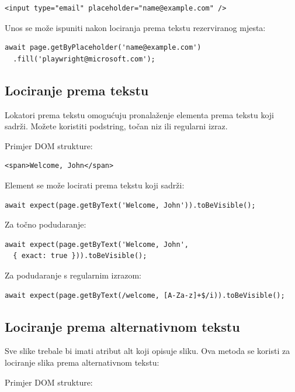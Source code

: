 \begin{verbatim}
<input type="email" placeholder="name@example.com" />
\end{verbatim}

Unos se može ispuniti nakon lociranja prema tekstu rezerviranog mjesta:

\begin{verbatim}
await page.getByPlaceholder('name@example.com')
  .fill('playwright@microsoft.com');
\end{verbatim}

\subsection*{Lociranje prema tekstu}

Lokatori prema tekstu omogućuju pronalaženje elementa prema tekstu koji sadrži.
Možete koristiti podstring, točan niz ili regularni izraz.

Primjer DOM strukture:

\begin{verbatim}
<span>Welcome, John</span>
\end{verbatim}

Element se može locirati prema tekstu koji sadrži:

\begin{verbatim}
await expect(page.getByText('Welcome, John')).toBeVisible();
\end{verbatim}

Za točno podudaranje:

\begin{verbatim}
await expect(page.getByText('Welcome, John', 
  { exact: true })).toBeVisible();
\end{verbatim}

Za podudaranje s regularnim izrazom:

\begin{verbatim}
await expect(page.getByText(/welcome, [A-Za-z]+$/i)).toBeVisible();
\end{verbatim}

\subsection*{Lociranje prema alternativnom tekstu}

Sve slike trebale bi imati atribut alt koji opisuje sliku.
Ova metoda se koristi za lociranje slika prema alternativnom tekstu:

Primjer DOM strukture:

